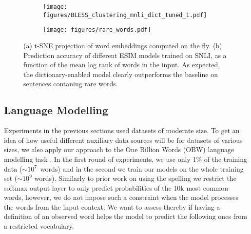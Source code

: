 \begin{figure}
  \begin{subfigure}[c]{0.5\textwidth}
    \texttt{[image: figures/BLESS\_clustering\_mnli\_dict\_tuned\_1.pdf]}
    \caption{\label{fig:SNLI_plot}}
  \end{subfigure}
  \begin{subfigure}[c]{0.5\textwidth}
    \texttt{[image: figures/rare\_words.pdf]}
    \caption{\label{fig:SNLI_rare_words}}
  \end{subfigure}
  \caption{
    (a) t-SNE projection of word embeddings computed on the fly. 
    (b) Prediction accuracy of different ESIM models trained on SNLI, as a function of the mean log rank of words in the input. As expected, the dictionary-enabled model clearly outperforms the baseline on sentences contaning rare words. 
  }
\end{figure}

\subsection{Language Modelling}
\label{sec:lm}
Experiments in the previous sections used datasets of moderate size. To get an idea of how useful different auxiliary data sources will be for datasets of various sizes, we also apply our approach to the One Billion Words (OBW) language modelling task \citep{chelba2014obw}. In the first round of experiments, we use only 1\% of the training data ($\sim 10^7$~words) and in the second we train our models on the whole training set ($\sim 10^9$ words). Similarly to prior work on using the spelling \citep{ling2015finding} we restrict the softmax output layer to only predict probabilities of the 10k most common words, however, we do not impose such a constraint when the model processes the words from the input context. 
We want to assess thereby if having a definition of an observed word helps the model to predict the following ones from a restricted vocabulary.





